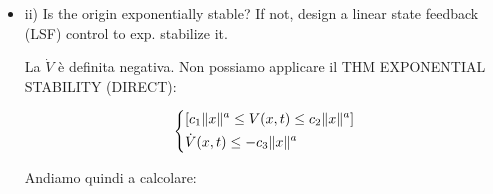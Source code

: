 \begin{itemize}
$(1-x_1^2) > 0\ \forall x_1\in(-1;+1), -x_2^4<0 \iff$ \newline Per $x_1\in(-1;+1)$, la $\dot{V}(x)$ + \underline{semidefinita negativa}! (\`E 0 anche in un altro punto differente dall'origine). 

$\dot{V}(x)$ \underline{NEGATIVE SEMIDEFINITE} $\iff \dot{V}(x) \leq 0$. (Se ci fosse stata chiesta la "stabilità", è da intendersi in senso ampio, \underline{generale}!)
Possiamo quindi applicare il criterio di Krasowskii:

\[
	S = \{\dot{V}(x) = 0\} = \{x\in\oball(0,1)\ |\ \dot{V}(x) = 0\} = \{x\in\oball(0,1)\ |\ -x_2^4(1-x_1^2) = 0\} \implies
\]
\[
	S = \{x\ |\ x_1\in\R,\ x_2 = 0\} = \{x\ |\ x = \begin{bmatrix}k\\0\end{bmatrix}\} \implies x_2 = 0
\]

Andiamo a vedere cosa succede quando parto da qualsiasi altro punto.
\{Se parto da $S$ resto in $S$?\}, \{$x_2(0) = 0\implies x_2(t) = 0\ \forall t$\}. $\implies \dot{x}_2(t) = 0$. Per essere delle traiettorie devono soddisfare identicamente l'equazione differenziale:

\[
	\left\{
	\begin{aligned}
	&\dot{x}_1 = 0\\
	&0 = -3x_1
	\end{aligned}
	\right. \implies\ 
	\left\{
	\begin{aligned}
	&x_1(t) =\ constant\ = x_1(0)\\
	&x_1(t) = x_1(0) = 0
	\end{aligned}
	\right.
\]

$\implies$ L'unico modo per partire in $S$ è quindi partire da $(0,0)$. Abbiamo applicato Krasowskii $\implies$ l'equilibrio origine è \underline{asintoticamente stabile};

\item{ii)} Is the origin exponentially stable? If not, design a linear state feedback (LSF) control to exp. stabilize it.

La $\dot{V}$ è definita negativa. Non possiamo applicare il THM EXPONENTIAL STABILITY (DIRECT):

\[
	\left\{
	\begin{aligned}
	&[c_1\lVert x\rVert^a \leq V(x,t) \leq c_2\lVert x\rVert^a]\\
	&\dot{V}(x,t) \leq -c_3\lVert x\rVert^a
	\end{aligned}
	\right.
\]

Andiamo quindi a calcolare:


\end{itemize}
